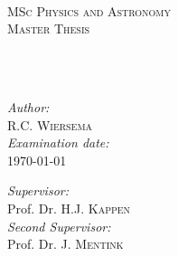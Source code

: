 \documentclass[
11pt, %
english, %
singlespacing, %
headsepline, %
]{stylesheet/MastersDoctoralThesis} %
\author{Roeland Wiersema} %
\theoremstyle{plain}
\begin{document}
\frontmatter %

\pagestyle{plain} %


\begin{titlepage}
\begin{center}

\begin{minipage}{\linewidth}%
\end{minipage}\\[0.5cm]

\textsc{\Large MSc Physics and Astronomy}\\[0.5cm] %
\textsc{\Large Master Thesis}\\[0.5cm] %

\HRule \\[0.4cm] %
{\huge \bfseries \ttitle\par}\vspace{0.4cm} %
\HRule \\[1.5cm] %
 
\begin{minipage}[t]{0.4\textwidth}
\begin{flushleft} \large
\emph{Author:}\\
\textcolor{rured}{R.C.} \textsc{\textcolor{rured}{Wiersema}}\\[0.5cm] %
\large \emph{Examination date: }\\
\textcolor{rured}{\today}\\
\end{flushleft}
\end{minipage}
\begin{minipage}[t]{0.4\textwidth}
\begin{flushright} \large
\emph{Supervisor:} \\
\textcolor{rured}{Prof. Dr. H.J.} \textsc{\textcolor{rured}{Kappen}} \\[0.5cm] 
\large \emph{Second Supervisor: }\\
\textcolor{rured}{Prof. Dr. J.} \textsc{\textcolor{rured}{Mentink}} \\


\end{flushright}
\end{minipage}
\end{center}
\end{titlepage}
\end{document}
